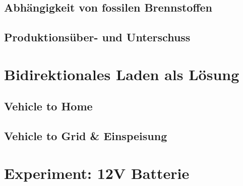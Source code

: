 \documentclass[12pt]{article}
\begin{document}
    \subsection{Abhängigkeit von fossilen Brennstoffen}

    \subsection{Produktionsüber- und Unterschuss}

    \section{Bidirektionales Laden als Lösung}

    \subsection{Vehicle to Home}

    \subsection{Vehicle to Grid \& Einspeisung}

    \section{Experiment: 12V Batterie}
\end{document}
